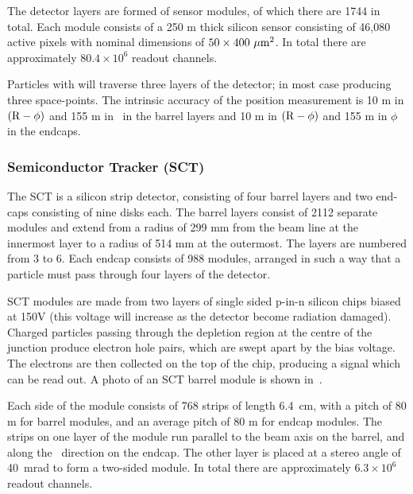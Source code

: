 The detector layers are formed of sensor modules, of which there are 1744 in
total. Each module consists of a 250 \micro m thick
silicon sensor consisting of 46,080 active pixels with nominal dimensions of
$50\times400~\mu \rm{m}^{2}$. In total
there are approximately $80.4\times 10^{6}$ readout channels.

Particles with  will traverse three layers of the detector; in most case
producing three space-points. The intrinsic accuracy of the position
measurement is 10 \micro m in $(\rm{R}-\phi)$ and 155 \micro m in \z\ in the
barrel layers and 10 \micro m in $(\rm{R}-\phi)$ and 155 \micro m in $\phi$ in
the endcaps.

\subsubsection{Semiconductor Tracker (SCT)}

\label{sec:Detector-SCT}

The SCT is a silicon strip detector, consisting of four barrel layers and two end-caps
consisting of nine disks each. The barrel layers consist of 2112 separate modules and
extend from a radius of 299 mm from the beam line at the innermost layer to a
radius of 514 mm at the outermost. The layers are numbered from 3 to 6. Each
endcap consists of 988 modules, arranged in such a way that a particle must pass
through four layers of the detector.

SCT modules are made from two layers of single sided p-in-n silicon chips biased
at 150V (this voltage will increase as the detector become radiation damaged). 
Charged particles passing through the depletion region at the centre of
the junction produce electron hole pairs, which are swept apart by the bias
voltage. The electrons are then collected on the top of the chip, producing a
signal which can be read out. A photo of an SCT barrel module is shown
in~.

Each side of the module consists of 768 strips of length 6.4~cm,
with a pitch of 80 \micro m for barrel modules, and an average pitch of 80
\micro m for endcap modules. The strips on one layer
of the module run parallel to the
beam axis on the barrel, and along the \R\ direction on the endcap. The other
layer is placed at a stereo angle of 40~mrad to form a two-sided module. 
In total
there are approximately $6.3 \times 10^{6}$ readout channels.

